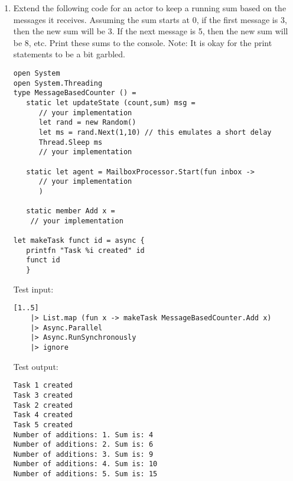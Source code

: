 \documentclass{article}
\begin{document}
\begin{enumerate}
\item
Extend the following code for an actor to keep a running sum based on the messages it receives. Assuming the sum starts at 0, if the first message is 3, then the new sum will be 3. If the next message is 5, then the new sum will be 8, etc. Print these sums to the console. Note: It is okay for the print statements to be a bit garbled.

\begin{lstlisting}
open System
open System.Threading
type MessageBasedCounter () = 
   static let updateState (count,sum) msg =                
      // your implementation
      let rand = new Random()
      let ms = rand.Next(1,10) // this emulates a short delay
      Thread.Sleep ms
      // your implementation

   static let agent = MailboxProcessor.Start(fun inbox -> 
      // your implementation
      )

   static member Add x =
    // your implementation

let makeTask funct id = async {
   printfn "Task %i created" id
   funct id
   }
\end{lstlisting}

\noindent
Test input:

\begin{lstlisting}
[1..5]
    |> List.map (fun x -> makeTask MessageBasedCounter.Add x)
    |> Async.Parallel
    |> Async.RunSynchronously
    |> ignore
\end{lstlisting}

\noindent
Test output:

\begin{lstlisting}
Task 1 created
Task 3 created
Task 2 created
Task 4 created
Task 5 created
Number of additions: 1. Sum is: 4
Number of additions: 2. Sum is: 6
Number of additions: 3. Sum is: 9
Number of additions: 4. Sum is: 10
Number of additions: 5. Sum is: 15
\end{lstlisting}

\end{enumerate}
\end{document}

